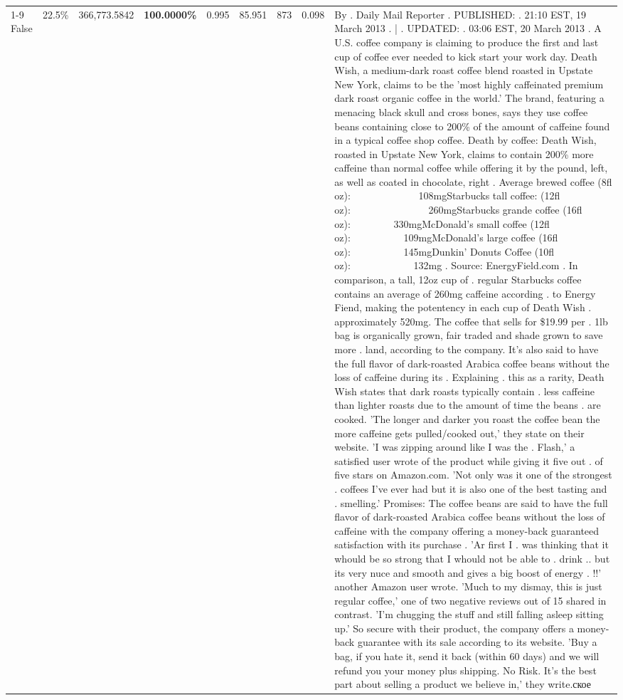 \begin{table}[H]
{\begin{tabular}{lllrlllll}
\cline{1-9} \cline{2-9}
False & 22.5\% & 366,773.5842 & \bfseries \color{red} 100.0000\% & 0.995 & 85.951 & 873 & 0.098 & By . Daily Mail Reporter . PUBLISHED: . 21:10 EST, 19 March 2013 . | . UPDATED: . 03:06 EST, 20 March 2013 . A U.S. coffee company is claiming to produce the first and last cup of coffee ever needed to kick start your work day. Death Wish, a medium-dark roast coffee blend roasted in Upstate New York, claims to be the 'most highly caffeinated premium dark roast organic coffee in the world.' The brand, featuring a menacing black skull and cross bones, says they use coffee beans containing close to 200\% of the amount of caffeine found in a typical coffee shop coffee. Death by coffee: Death Wish, roasted in Upstate New York, claims to contain 200\% more caffeine than normal coffee while offering it by the pound, left, as well as coated in chocolate, right . Average brewed coffee (8fl oz):              108mgStarbucks tall coffee: (12fl oz):                260mgStarbucks grande coffee (16fl oz):         330mgMcDonald's small coffee (12fl oz):           109mgMcDonald's large coffee (16fl oz):           145mgDunkin' Donuts Coffee (10fl oz):             132mg . Source: EnergyField.com . In comparison, a tall, 12oz cup of . regular Starbucks coffee contains an average of 260mg caffeine according . to Energy Fiend, making the potentency in each cup of Death Wish . approximately 520mg. The coffee that sells for \$19.99 per . 1lb bag is organically grown, fair traded and shade grown to save more . land, according to the company. It's also said to have the full flavor of dark-roasted Arabica coffee beans without the loss of caffeine during its . Explaining . this as a rarity, Death Wish states that dark roasts typically contain . less caffeine than lighter roasts due to the amount of time the beans . are cooked. 'The longer and darker you roast the coffee bean the more caffeine gets pulled/cooked out,' they state on their website. 'I was zipping around like I was the . Flash,' a satisfied user wrote of the product while giving it five out . of five stars on Amazon.com. 'Not only was it one of the strongest . coffees I've ever had but it is also one of the best tasting and . smelling.’ Promises: The coffee beans are said to have the full flavor of dark-roasted Arabica coffee beans without the loss of caffeine with the company offering a money-back guaranteed satisfaction with its purchase . 'Ar first I . was thinking that it whould be so strong that I whould not be able to . drink .. but its very nuce and smooth and gives a big boost of energy . !!' another Amazon user wrote. 'Much to my dismay, this is just regular coffee,' one of two negative reviews out of 15 shared in contrast. 'I'm chugging the stuff and still falling asleep sitting up.' So secure with their product, the company offers a money-back guarantee with its sale according to its website. 'Buy a bag, if you hate it, send it back (within 60 days) and we will refund you your money plus shipping. No Risk. It’s the best part about selling a product we believe in,' they write.ское \\

\end{tabular}}
\end{table}
